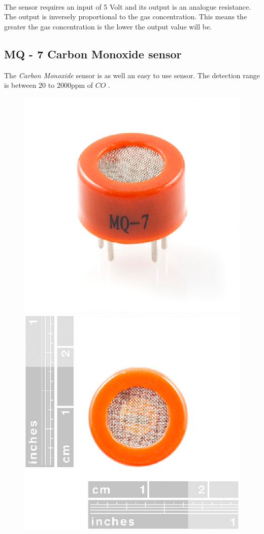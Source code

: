 \documentclass[12pt,a4paper]{report}
\begin{document}
\ \\
The sensor requires an input of 5 Volt and its output is an analogue resistance. The output is inversely proportional to the gas concentration. This means the greater the gas concentration is the lower the output value will be.
\ \\
%
\subsection{MQ - 7 Carbon Monoxide  sensor}
The \emph{Carbon Monoxide} sensor is as well an easy to use sensor.  The detection range is between 20 to 2000ppm of $CO$ \cite{website:mq7}.
\ \\
\begin{figure}[H]
\centering
\includegraphics*[scale=0.45]{mq7}
\includegraphics*[scale=0.45]{mq7_2}

\end{figure}
\end{document}
